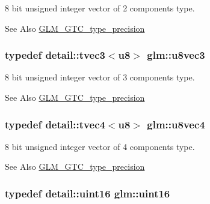 8 bit unsigned integer vector of 2 components type. 

\begin{DoxySeeAlso}{See Also}
\hyperlink{group__gtc__type__precision}{G\-L\-M\-\_\-\-G\-T\-C\-\_\-type\-\_\-precision} 
\end{DoxySeeAlso}
\hypertarget{group__gtc__type__precision_ga4dcca30d49842b1f4c919a0303944099}{
\subsubsection[{u8vec3}]{\setlength{\rightskip}{0pt plus 5cm}typedef detail\-::tvec3$<$u8$>$ {\bf glm\-::u8vec3}}}\label{group__gtc__type__precision_ga4dcca30d49842b1f4c919a0303944099}


8 bit unsigned integer vector of 3 components type. 

\begin{DoxySeeAlso}{See Also}
\hyperlink{group__gtc__type__precision}{G\-L\-M\-\_\-\-G\-T\-C\-\_\-type\-\_\-precision} 
\end{DoxySeeAlso}
\hypertarget{group__gtc__type__precision_ga165acf96e342bac32fe1dbf5bfd8a4e1}{
\subsubsection[{u8vec4}]{\setlength{\rightskip}{0pt plus 5cm}typedef detail\-::tvec4$<$u8$>$ {\bf glm\-::u8vec4}}}\label{group__gtc__type__precision_ga165acf96e342bac32fe1dbf5bfd8a4e1}


8 bit unsigned integer vector of 4 components type. 

\begin{DoxySeeAlso}{See Also}
\hyperlink{group__gtc__type__precision}{G\-L\-M\-\_\-\-G\-T\-C\-\_\-type\-\_\-precision} 
\end{DoxySeeAlso}
\hypertarget{group__gtc__type__precision_gad8c2939e1fdd8e5828b31d95c52255d5}{
\subsubsection[{uint16}]{\setlength{\rightskip}{0pt plus 5cm}typedef detail\-::uint16 {\bf glm\-::uint16}}}\label{group__gtc__type__precision_gad8c2939e1fdd8e5828b31d95c52255d5}


